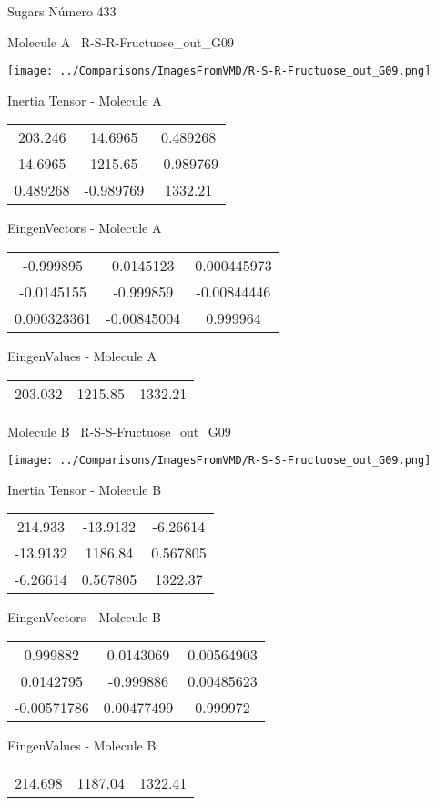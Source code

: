 \vtab[-3cm]
\begin{center}
{\large Sugars \tab Número 433}
\end{center}
\begin{multicols}{2}
\begin{center}

Molecule A \
R-S-R-Fructuose\_out\_G09

\texttt{[image: ../Comparisons/ImagesFromVMD/R-S-R-Fructuose\_out\_G09.png]}

Inertia Tensor - Molecule A \\
\begin{tabular}{|c c c|}
203.246	 & 	14.6965	 & 	0.489268	 \\
14.6965	 & 	1215.65	 & 	-0.989769	 \\
0.489268	 & 	-0.989769	 & 	1332.21
\end{tabular}

\vtab
 EingenVectors - Molecule A     \\
\begin{tabular}{|c c c|}
-0.999895	 & 	0.0145123	 & 	0.000445973	 \\
-0.0145155	 & 	-0.999859	 & 	-0.00844446	 \\
0.000323361	 & 	-0.00845004	 & 	0.999964
\end{tabular}

\vtab
 EingenValues - Molecule A     \\
\begin{tabular}{|c c c|}
203.032	 & 	1215.85	 & 	1332.21	 \\
\end{tabular}
\columnbreak

Molecule B \
R-S-S-Fructuose\_out\_G09

\texttt{[image: ../Comparisons/ImagesFromVMD/R-S-S-Fructuose\_out\_G09.png]}

Inertia Tensor - Molecule B \\
\begin{tabular}{|c c c|}
214.933	 & 	-13.9132	 & 	-6.26614	 \\
-13.9132	 & 	1186.84	 & 	0.567805	 \\
-6.26614	 & 	0.567805	 & 	1322.37
\end{tabular}

\vtab
 EingenVectors - Molecule B     \\
\begin{tabular}{|c c c|}
0.999882	 & 	0.0143069	 & 	0.00564903	 \\
0.0142795	 & 	-0.999886	 & 	0.00485623	 \\
-0.00571786	 & 	0.00477499	 & 	0.999972
\end{tabular}

\vtab
 EingenValues - Molecule B     \\
\begin{tabular}{|c c c|}
214.698	 & 	1187.04	 & 	1322.41	 \\
\end{tabular}

\end{center}
\end{multicols}

